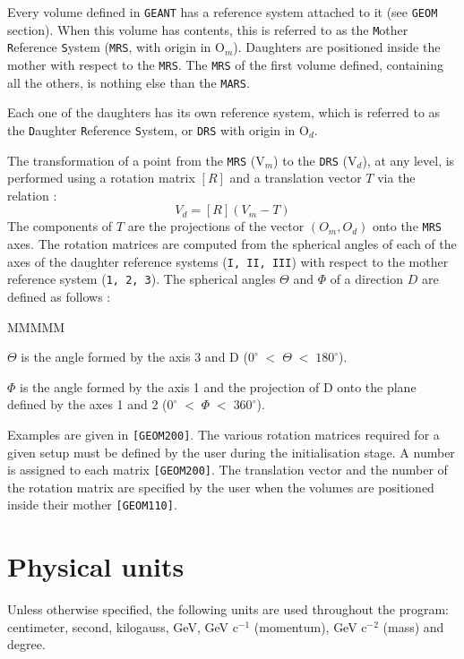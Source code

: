 Every volume defined in {\tt GEANT} has a reference system attached to
it (see {\tt GEOM} section). When this volume has contents, this
is referred to as the {\tt M}other {\tt R}eference {\tt S}ystem
({\tt MRS}, with origin in O$_m$). Daughters
are positioned inside the mother with respect to the {\tt MRS}. The 
{\tt MRS} of the first volume defined, containing all the others, is
nothing else than the {\tt MARS}.

Each one of the daughters has its own reference system, which is referred
to as the {\tt D}aughter {\tt R}eference {\tt S}ystem, or {\tt DRS} with
origin in O$_d$. 

The transformation of a point from the {\tt MRS} (V$_m$)
to the {\tt DRS} (V$_d$), at any level, is performed using a rotation 
matrix $[R]$ and a translation vector $T$ via the relation :
     \[ V_d  =[ R ](V_m -T) \]
The components of $T$ are the projections of the vector  $ (O_m, O_d) $
onto the {\tt MRS} axes.
The rotation matrices are computed from
the spherical angles of each of the axes of the
daughter reference systems ({\tt I, II, III})
with respect to the mother reference system ({\tt 1, 2, 3}).
The spherical angles $\Theta$ and $\Phi$ of a
direction $D$ are defined as follows :
\begin{DLtt}{MMMMM}
\item[$\Theta$]     is the angle formed by the axis 3 and D
                 ($0^{\circ}\;<\;\Theta\;<\;180^{\circ}$).
\item[$\Phi$]      is the angle formed by the axis 1 and the projection
                of D onto the plane defined by the axes 1 and 2
                 ($0^{\circ}\;<\;\Phi\;<\;360^{\circ}$).
\end{DLtt}
Examples are given in {\tt [GEOM200]}.
The various rotation matrices required for a given setup must be
defined by the user during the initialisation stage.
A number is assigned to each matrix {\tt [GEOM200]}.
The translation vector and the number of the rotation
matrix are specified by the user when the volumes are
positioned inside their mother {\tt [GEOM110]}.

\section{Physical units}
 
Unless otherwise specified, the following units are
used throughout the program:
centimeter, second, kilogauss, GeV, GeV c$^{-1}$ (momentum), 
GeV c$^{-2}$ (mass) and degree.
